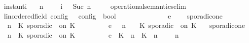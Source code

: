 \begin{isabellebody}
\isanewline
\ \ instant{\isacharunderscore}i{\isacharcolon}\isanewline
\ \ {\isacartoucheopen}{\isacharparenleft}{\isasymGamma}{\isacharcomma}\ n\ {\isasymturnstile}\ {\isacharbrackleft}{\isacharbrackright}\ {\isasymtriangleright}\ {\isasymPhi}{\isacharparenright}\ {\isasymhookrightarrow}\isactrlsub i\ \ {\isacharparenleft}{\isasymGamma}{\isacharcomma}\ Suc\ n\ {\isasymturnstile}\ {\isasymPhi}\ {\isasymtriangleright}\ {\isacharbrackleft}{\isacharbrackright}{\isacharparenright}{\isacartoucheclose}\isanewline
\isanewline
{}\isamarkupfalse%
\ operational{\isacharunderscore}semantics{\isacharunderscore}elim\isanewline
\ \ {\isacharcolon}{\isacharcolon}{\isacartoucheopen}{\isacharparenleft}{\isacharprime}{\isasymtau}{\isacharcolon}{\isacharcolon}linordered{\isacharunderscore}field{\isacharparenright}\ config\ {\isasymRightarrow}\ {\isacharprime}{\isasymtau}\ config\ {\isasymRightarrow}\ bool{\isacartoucheclose}\ \ \ \ \ \ \ \ \ \ \ \ \ \ {\isacharparenleft}{\isachardoublequoteopen}{\isacharunderscore}\ {\isasymhookrightarrow}\isactrlsub e\ {\isacharunderscore}{\isachardoublequoteclose}\ {}{}{\isacharparenright}\isanewline
{}\isanewline
\ \ sporadic{\isacharunderscore}on{\isacharunderscore}e{}{\isacharcolon}\isanewline
\ \ {\isacartoucheopen}{\isacharparenleft}{\isasymGamma}{\isacharcomma}\ n\ {\isasymturnstile}\ {\isacharparenleft}{\isacharparenleft}K\ sporadic\ {\isasymtau}\ on\ K\ {\isacharhash}\ {\isasymPsi}{\isacharparenright}\ {\isasymtriangleright}\ {\isasymPhi}{\isacharparenright}\isanewline
\ \ \ \ \ {\isasymhookrightarrow}\isactrlsub e\ \ {\isacharparenleft}{\isasymGamma}{\isacharcomma}\ n\ {\isasymturnstile}\ {\isasymPsi}\ {\isasymtriangleright}\ {\isacharparenleft}{\isacharparenleft}K\ sporadic\ {\isasymtau}\ on\ K\ {\isacharhash}\ {\isasymPhi}{\isacharparenright}{\isacharparenright}{\isacartoucheclose}\isanewline
{\isacharbar}\ sporadic{\isacharunderscore}on{\isacharunderscore}e{}{\isacharcolon}\isanewline
\ \ {\isacartoucheopen}{\isacharparenleft}{\isasymGamma}{\isacharcomma}\ n\ {\isasymturnstile}\ {\isacharparenleft}{\isacharparenleft}K\ sporadic\ {\isasymtau}\ on\ K\ {\isacharhash}\ {\isasymPsi}{\isacharparenright}\ {\isasymtriangleright}\ {\isasymPhi}{\isacharparenright}\isanewline
\ \ \ \ \ {\isasymhookrightarrow}\isactrlsub e\ \ {\isacharparenleft}{\isacharparenleft}{\isacharparenleft}K\ {\isasymUp}\ n{\isacharparenright}\ {\isacharhash}\ {\isacharparenleft}K\ {\isasymDown}\ n\ {\isacharat}\ {\isasymtau}{\isacharparenright}\ {\isacharhash}\ {\isasymGamma}{\isacharparenright}{\isacharcomma}\ n\ {\isasymturnstile}\ {\isasymPsi}\ {\isasymtriangleright}\ {\isasymPhi}{\isacharparenright}{\isacartoucheclose}\isanewline

\end{isabellebody}

